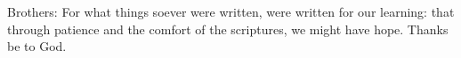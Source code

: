 Brothers: For what things soever were written, were written for our learning: that through patience and the comfort of the scriptures, we might have hope. \rubric{\Rbar} Thanks be to God.